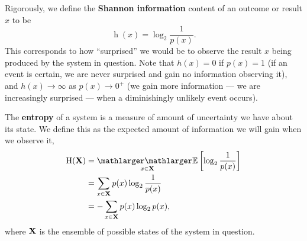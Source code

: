 Rigorously, we define the \textbf{Shannon information} content of an outcome or result $x$ to be
\begin{equation}
\label{eq:shannon-information}
\operatorname{h}( x ) = \log_2 \frac{1}{p(x)}
.\end{equation}
This corresponds to how ``surprised'' we would be to observe the result $x$ being produced by the system in question.
Note that $h(x)=0$ if $p(x)=1$ (if an event is certain, we are never surprised and gain no information observing it), and $h(x) \to \infty$ as $p(x) \to 0^+$ (we gain more information --- we are increasingly surprised --- when a diminishingly unlikely event occurs).

The \textbf{entropy} of a system is a measure of amount of uncertainty we have about its state.
We define this as the expected amount of information we will gain when we observe it,
\begin{align}
\HH( \SET{X} )
  &= \EE_{x \in \SET{X}} \left[ \log_2 \frac{1}{p(x)} \right] \notag
\\&= \sum_{x \in \SET{X}} p(x) \log_2 \frac{1}{p(x)} \notag
\\&= - \sum_{x \in \SET{X}} p(x) \log_2 p(x)
,\end{align}
where $\mathbf{X}$ is the ensemble of possible states of the system in question.

